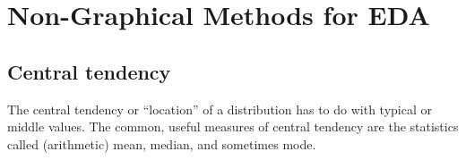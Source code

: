 \documentclass[openany]{book}
\begin{document}









\section{Non-Graphical Methods for EDA}

\subsection{Central tendency} The central tendency or “location” of a distribution has to do with typical or middle values. The common, useful measures of central tendency are the statistics called (arithmetic) mean, median, and sometimes mode. 


\end{document}
